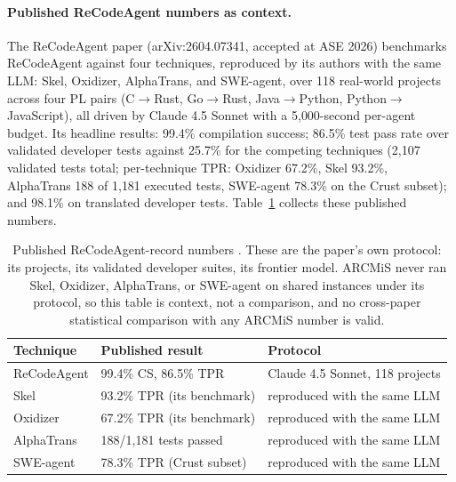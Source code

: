 \documentclass[11pt]{article}
\begin{document}
\paragraph{Published ReCodeAgent numbers as context.}
The ReCodeAgent paper (arXiv:2604.07341, accepted at ASE 2026)
benchmarks ReCodeAgent against four techniques, reproduced by its
authors with the same LLM: Skel, Oxidizer, AlphaTrans, and SWE-agent,
over 118 real-world projects across four PL pairs (C$\to$Rust,
Go$\to$Rust, Java$\to$Python, Python$\to$JavaScript), all driven by
Claude 4.5 Sonnet with a 5{,}000-second per-agent budget. Its headline
results: 99.4\% compilation success; 86.5\% test pass rate over
validated developer tests against 25.7\% for the competing techniques
(2{,}107 validated tests total; per-technique TPR: Oxidizer 67.2\%,
Skel 93.2\%, AlphaTrans 188 of 1{,}181 executed tests, SWE-agent
78.3\% on the Crust subset); and 98.1\% on translated developer tests.
Table~\ref{tab:published} collects these published numbers.

\begin{table}[ht]
\centering
\begin{tabular}{@{}lll@{}}
\toprule
Technique & Published result & Protocol \\
\midrule
ReCodeAgent & 99.4\% CS, 86.5\% TPR & Claude 4.5 Sonnet, 118 projects \\
Skel & 93.2\% TPR (its benchmark) & reproduced with the same LLM \\
Oxidizer & 67.2\% TPR (its benchmark) & reproduced with the same LLM \\
AlphaTrans & 188/1{,}181 tests passed & reproduced with the same LLM \\
SWE-agent & 78.3\% TPR (Crust subset) & reproduced with the same LLM \\
\bottomrule
\end{tabular}
\caption{Published ReCodeAgent-record numbers
\cite{recodeagent2026}. These are the paper's own protocol: its
projects, its validated developer suites, its frontier model. ARCMiS
never ran Skel, Oxidizer, AlphaTrans, or SWE-agent on shared instances
under its protocol, so this table is context, not a comparison, and no
cross-paper statistical comparison with any ARCMiS number is valid.}
\label{tab:published}
\end{table}
\end{document}
